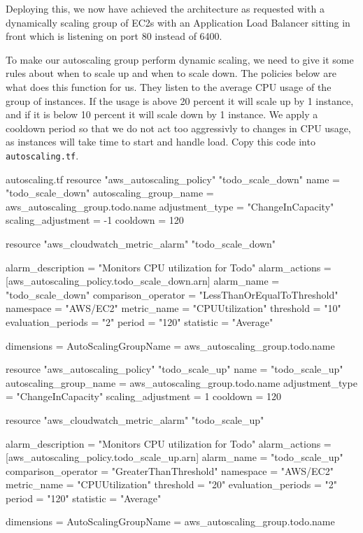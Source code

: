 \documentclass{csse4400}
\begin{document}
Deploying this, we now have achieved the architecture as requested with a dynamically scaling group of EC2s with an Application Load Balancer sitting in front which is listening on port 80 instead of 6400.

To make our autoscaling group perform dynamic scaling, we need to give it some rules about when to scale up and when to scale down.
The policies below are what does this function for us. They listen to the average CPU usage of the group of instances.
If the usage is above 20 percent it will scale up by 1 instance,
and if it is below 10 percent it will scale down by 1 instance.
We apply a cooldown period so that we do not act too aggressivly to changes in CPU usage,
as instances will take time to start and handle load.
Copy this code into \texttt{autoscaling.tf}.

\begin{code}[language=terraform,numbers=none,keepspaces=true]{autoscaling.tf}
resource "aws_autoscaling_policy" "todo_scale_down" {
  name                   = "todo_scale_down"
  autoscaling_group_name = aws_autoscaling_group.todo.name
  adjustment_type        = "ChangeInCapacity"
  scaling_adjustment     = -1
  cooldown               = 120
}

resource "aws_cloudwatch_metric_alarm" "todo_scale_down" {
  alarm_description   = "Monitors CPU utilization for Todo"
  alarm_actions       = [aws_autoscaling_policy.todo_scale_down.arn]
  alarm_name          = "todo_scale_down"
  comparison_operator = "LessThanOrEqualToThreshold"
  namespace           = "AWS/EC2"
  metric_name         = "CPUUtilization"
  threshold           = "10"
  evaluation_periods  = "2"
  period              = "120"
  statistic           = "Average"

  dimensions          = {
    AutoScalingGroupName = aws_autoscaling_group.todo.name
  }
}

resource "aws_autoscaling_policy" "todo_scale_up" {
  name                   = "todo_scale_up"
  autoscaling_group_name = aws_autoscaling_group.todo.name
  adjustment_type        = "ChangeInCapacity"
  scaling_adjustment     = 1
  cooldown               = 120
}

resource "aws_cloudwatch_metric_alarm" "todo_scale_up" {
  alarm_description   = "Monitors CPU utilization for Todo"
  alarm_actions       = [aws_autoscaling_policy.todo_scale_up.arn]
  alarm_name          = "todo_scale_up"
  comparison_operator = "GreaterThanThreshold"
  namespace           = "AWS/EC2"
  metric_name         = "CPUUtilization"
  threshold           = "20"
  evaluation_periods  = "2"
  period              = "120"
  statistic           = "Average"

  dimensions          = {
    AutoScalingGroupName = aws_autoscaling_group.todo.name
  }
}
\end{code}
\end{document}

